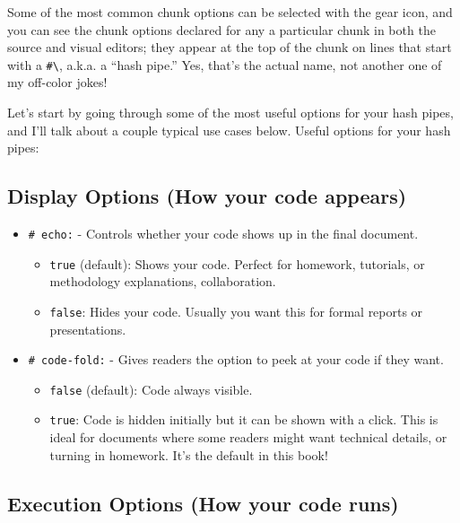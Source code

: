 \documentclass[
  letterpaper,
]{book}
\begin{document}
Some of the most common chunk options can be selected with the gear
icon, and you can see the chunk options declared for any a particular
chunk in both the source and visual editors; they appear at the top of
the chunk on lines that start with a
\texttt{\#\textbackslash{}\textbar{}}, a.k.a. a ``hash pipe.'' Yes,
that's the actual name, not another one of my off-color jokes!

Let's start by going through some of the most useful options for your
hash pipes, and I'll talk about a couple typical use cases below. Useful
options for your hash pipes:

\subsection{Display Options (How your code
appears)}\label{display-options-how-your-code-appears}

\begin{itemize}
\item
  \texttt{\#\textbar{}\ echo:} - Controls whether your code shows up in
  the final document.

  \begin{itemize}
  \item
    \texttt{true} (default): Shows your code. Perfect for homework,
    tutorials, or methodology explanations, collaboration.
  \item
    \texttt{false}: Hides your code. Usually you want this for formal
    reports or presentations.
  \end{itemize}
\item
  \texttt{\#\textbar{}\ code-fold:} - Gives readers the option to peek
  at your code if they want.

  \begin{itemize}
  \item
    \texttt{false} (default): Code always visible.
  \item
    \texttt{true}: Code is hidden initially but it can be shown with a
    click. This is ideal for documents where some readers might want
    technical details, or turning in homework. It's the default in this
    book!
  \end{itemize}
\end{itemize}

\subsection{Execution Options (How your code
runs)}\label{execution-options-how-your-code-runs}
\end{document}
